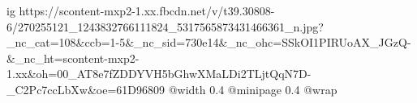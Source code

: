  
 
 
 
 

\ifcmt
  ig https://scontent-mxp2-1.xx.fbcdn.net/v/t39.30808-6/270255121_1243832766111824_5317565873431466361_n.jpg?_nc_cat=108&ccb=1-5&_nc_sid=730e14&_nc_ohc=SSkOI1PIRUoAX_JGzQ-&_nc_ht=scontent-mxp2-1.xx&oh=00_AT8e7fZDDYVH5bGhwXMaLDi2TLjtQqN7D-_C2Pc7ccLbXw&oe=61D96809
  @width 0.4
  @minipage 0.4
  @wrap \parpic[r]
\fi
